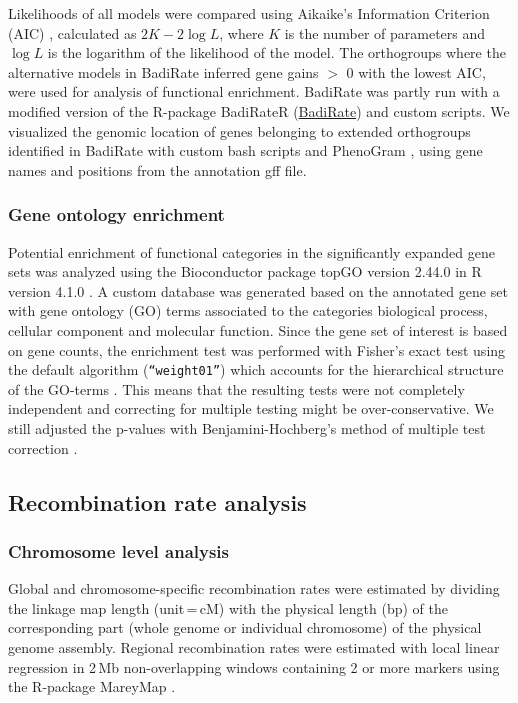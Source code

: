 \documentclass[twocolumn]{bmcart}%
\begin{document}
Likelihoods of all models were compared using Aikaike’s Information Criterion (AIC) \cite{akaikeNewLookStatistical1974}, calculated as $2K - 2\log{L}$, where $K$ is the number of parameters and $\log{L}$ is the logarithm of the likelihood of the model. The orthogroups where the alternative models in BadiRate inferred gene gains $>$ 0 with the lowest AIC, were used for analysis of functional enrichment. BadiRate was partly run with a modified version of the R-package BadiRateR (\href{https://palfalvi.github.io/badirater/articles/badirater.html}{BadiRate}) and custom scripts. We visualized the genomic location of genes belonging to extended orthogroups identified in BadiRate with custom bash scripts and PhenoGram \cite{wolfeVisualizingGenomicInformation2013}, using gene names and positions from the annotation gff file.
\subsubsection*{Gene ontology enrichment}
Potential enrichment of functional categories in the significantly expanded gene sets was analyzed using the Bioconductor package topGO version 2.44.0 \cite{alexaTopGOEnrichmentAnalysis2021} in R version 4.1.0 \cite{rcoreteam2021.LanguageEnvironmentStatistical}. A custom database was generated based on the annotated gene set with gene ontology (GO) terms associated to the categories biological process, cellular component and molecular function. Since the gene set of interest is based on gene counts, the enrichment test was performed with Fisher’s exact test using the default algorithm (\texttt{“weight01”}) which accounts for the hierarchical structure of the GO-terms \cite{alexaImprovedScoringFunctional2006}. This means that the resulting tests were not completely independent and correcting for multiple testing might be over-conservative. We still adjusted the p-values with Benjamini-Hochberg’s method of multiple test correction \cite{benjaminiControllingFalseDiscovery1995}.
\subsection*{Recombination rate analysis}
\subsubsection*{Chromosome level analysis}
Global and chromosome-specific recombination rates were estimated by dividing the linkage map length (unit\,=\,cM) with the physical length (bp) of the corresponding part (whole genome or individual chromosome) of the physical genome assembly. Regional recombination rates were estimated with local linear regression in 2\,Mb non-overlapping windows containing 2 or more markers using the R-package MareyMap \cite{rezvoyMareyMapRbasedTool2007}. 
\end{document}
